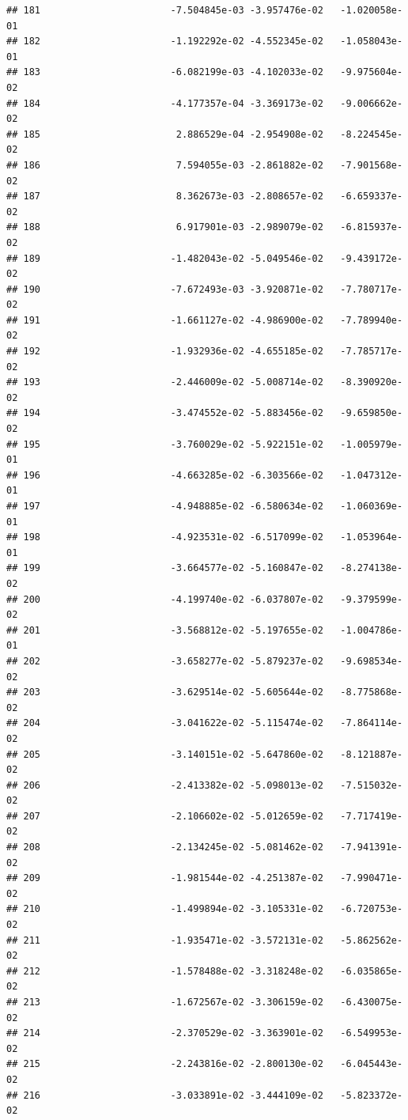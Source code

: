 \documentclass[
]{article}
\begin{document}
\begin{verbatim}
## 181                       -7.504845e-03 -3.957476e-02   -1.020058e-01
## 182                       -1.192292e-02 -4.552345e-02   -1.058043e-01
## 183                       -6.082199e-03 -4.102033e-02   -9.975604e-02
## 184                       -4.177357e-04 -3.369173e-02   -9.006662e-02
## 185                        2.886529e-04 -2.954908e-02   -8.224545e-02
## 186                        7.594055e-03 -2.861882e-02   -7.901568e-02
## 187                        8.362673e-03 -2.808657e-02   -6.659337e-02
## 188                        6.917901e-03 -2.989079e-02   -6.815937e-02
## 189                       -1.482043e-02 -5.049546e-02   -9.439172e-02
## 190                       -7.672493e-03 -3.920871e-02   -7.780717e-02
## 191                       -1.661127e-02 -4.986900e-02   -7.789940e-02
## 192                       -1.932936e-02 -4.655185e-02   -7.785717e-02
## 193                       -2.446009e-02 -5.008714e-02   -8.390920e-02
## 194                       -3.474552e-02 -5.883456e-02   -9.659850e-02
## 195                       -3.760029e-02 -5.922151e-02   -1.005979e-01
## 196                       -4.663285e-02 -6.303566e-02   -1.047312e-01
## 197                       -4.948885e-02 -6.580634e-02   -1.060369e-01
## 198                       -4.923531e-02 -6.517099e-02   -1.053964e-01
## 199                       -3.664577e-02 -5.160847e-02   -8.274138e-02
## 200                       -4.199740e-02 -6.037807e-02   -9.379599e-02
## 201                       -3.568812e-02 -5.197655e-02   -1.004786e-01
## 202                       -3.658277e-02 -5.879237e-02   -9.698534e-02
## 203                       -3.629514e-02 -5.605644e-02   -8.775868e-02
## 204                       -3.041622e-02 -5.115474e-02   -7.864114e-02
## 205                       -3.140151e-02 -5.647860e-02   -8.121887e-02
## 206                       -2.413382e-02 -5.098013e-02   -7.515032e-02
## 207                       -2.106602e-02 -5.012659e-02   -7.717419e-02
## 208                       -2.134245e-02 -5.081462e-02   -7.941391e-02
## 209                       -1.981544e-02 -4.251387e-02   -7.990471e-02
## 210                       -1.499894e-02 -3.105331e-02   -6.720753e-02
## 211                       -1.935471e-02 -3.572131e-02   -5.862562e-02
## 212                       -1.578488e-02 -3.318248e-02   -6.035865e-02
## 213                       -1.672567e-02 -3.306159e-02   -6.430075e-02
## 214                       -2.370529e-02 -3.363901e-02   -6.549953e-02
## 215                       -2.243816e-02 -2.800130e-02   -6.045443e-02
## 216                       -3.033891e-02 -3.444109e-02   -5.823372e-02

\end{verbatim}
\end{document}

